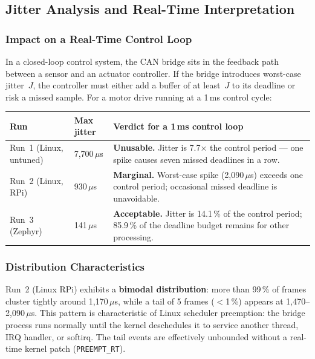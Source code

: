 \documentclass[11pt,a4paper]{article}
\begin{document}
\subsection{Jitter Analysis and Real-Time Interpretation}
\label{sec:jitter_analysis}

\subsubsection{Impact on a Real-Time Control Loop}

In a closed-loop control system, the CAN bridge sits in the feedback path between a
sensor and an actuator controller.  If the bridge introduces worst-case jitter~$J$,
the controller must either add a buffer of at least~$J$ to its deadline or risk a
missed sample.  For a motor drive running at a 1\,ms control cycle:

\begin{center}
\begin{tabular}{llp{7cm}}
    \toprule
    \textbf{Run} & \textbf{Max jitter} & \textbf{Verdict for a 1\,ms control loop} \\
    \midrule
    Run~1 (Linux, untuned) & 7{,}700\,$\mu$s &
        \textbf{Unusable.} Jitter is 7.7$\times$ the control period --- one spike
        causes seven missed deadlines in a row. \\
    Run~2 (Linux, RPi) & 930\,$\mu$s &
        \textbf{Marginal.} Worst-case spike (2{,}090\,$\mu$s) exceeds one control
        period; occasional missed deadline is unavoidable. \\
    Run~3 (Zephyr) & 141\,$\mu$s &
        \textbf{Acceptable.} Jitter is 14.1\,\% of the control period; 85.9\,\%
        of the deadline budget remains for other processing. \\
    \bottomrule
\end{tabular}
\end{center}

\subsubsection{Distribution Characteristics}

Run~2 (Linux RPi) exhibits a \textbf{bimodal distribution}: more than 99\,\% of frames
cluster tightly around 1{,}170\,$\mu$s, while a tail of 5 frames (${<}$1\,\%) appears
at 1{,}470--2{,}090\,$\mu$s.  This pattern is characteristic of Linux scheduler
preemption: the bridge process runs normally until the kernel deschedules it to service
another thread, IRQ handler, or softirq.  The tail events are effectively unbounded
without a real-time kernel patch (\texttt{PREEMPT\_RT}).
\end{document}
